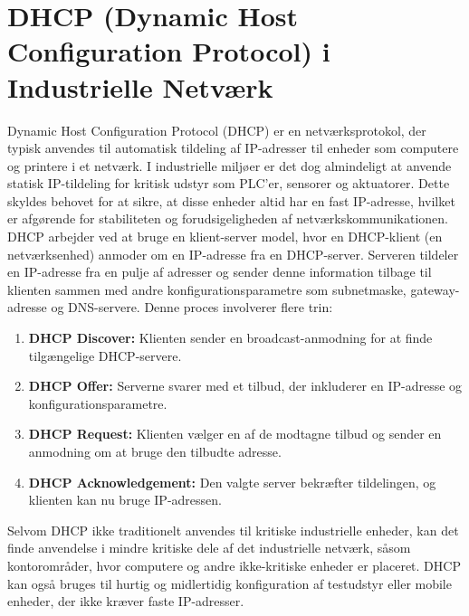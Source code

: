 \section{DHCP (Dynamic Host Configuration Protocol) i Industrielle Netværk}
Dynamic Host Configuration Protocol (DHCP) er en netværksprotokol, der typisk anvendes til automatisk tildeling af IP-adresser til enheder som computere og printere i et netværk. I industrielle miljøer er det dog almindeligt at anvende statisk IP-tildeling for kritisk udstyr som PLC'er, sensorer og aktuatorer. Dette skyldes behovet for at sikre, at disse enheder altid har en fast IP-adresse, hvilket er afgørende for stabiliteten og forudsigeligheden af netværkskommunikationen.
\newline
\newline
\noindent DHCP arbejder ved at bruge en klient-server model, hvor en DHCP-klient (en netværksenhed) anmoder om en IP-adresse fra en DHCP-server. Serveren tildeler en IP-adresse fra en pulje af adresser og sender denne information tilbage til klienten sammen med andre konfigurationsparametre som subnetmaske, gateway-adresse og DNS-servere. Denne proces involverer flere trin:
\begin{enumerate}
	\item \textbf{DHCP Discover:} Klienten sender en broadcast-anmodning for at finde tilgængelige DHCP-servere.
	\item \textbf{DHCP Offer:} Serverne svarer med et tilbud, der inkluderer en IP-adresse og konfigurationsparametre.
	\item \textbf{DHCP Request:} Klienten vælger en af de modtagne tilbud og sender en anmodning om at bruge den tilbudte adresse.
	\item \textbf{DHCP Acknowledgement:} Den valgte server bekræfter tildelingen, og klienten kan nu bruge IP-adressen.
\end{enumerate}
Selvom DHCP ikke traditionelt anvendes til kritiske industrielle enheder, kan det finde anvendelse i mindre kritiske dele af det industrielle netværk, såsom kontorområder, hvor computere og andre ikke-kritiske enheder er placeret. DHCP kan også bruges til hurtig og midlertidig konfiguration af testudstyr eller mobile enheder, der ikke kræver faste IP-adresser.

